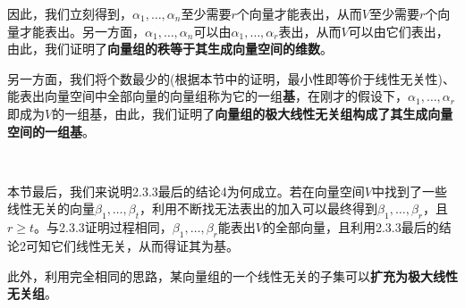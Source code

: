 \documentclass[a4paper,UTF8,fontset=windows]{ctexart}
\begin{document}
因此，我们立刻得到，$\alpha_1,\dots,\alpha_n$至少需要$r$个向量才能表出，从而$V$至少需要$r$个向量才能表出。另一方面，$\alpha_1,\dots,\alpha_n$可以由$\alpha_1,\dots,\alpha_r$表出，从而$V$可以由它们表出，由此，我们证明了\textbf{向量组的秩等于其生成向量空间的维数}。

另一方面，我们将个数最少的(根据本节中的证明，最小性即等价于线性无关性)、能表出向量空间中全部向量的向量组称为它的一组\textbf{基}，在刚才的假设下，$\alpha_1,\dots,\alpha_r$即成为$V$的一组基，由此，我们证明了\textbf{向量组的极大线性无关组构成了其生成向量空间的一组基}。

\

本节最后，我们来说明2.3.3最后的结论4为何成立。若在向量空间$V$中找到了一些线性无关的向量$\beta_1,\dots,\beta_t$，利用不断找无法表出的加入可以最终得到$\beta_1,\dots,\beta_r$，且$r\ge t$。与2.3.3证明过程相同，$\beta_1,\dots,\beta_r$能表出$V$的全部向量，且利用2.3.3最后的结论2可知它们线性无关，从而得证其为基。

此外，利用完全相同的思路，某向量组的一个线性无关的子集可以\textbf{扩充为极大线性无关组}。
\end{document}
